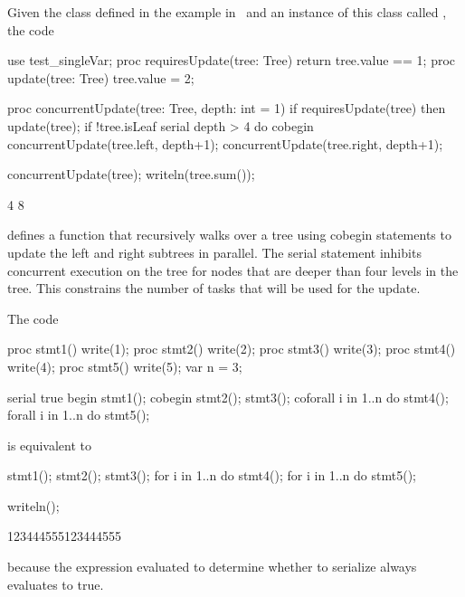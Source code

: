 \begin{example}
Given the  class defined in the example
in~ and an instance of this class
called , the code
\begin{chapelpre}
use test\_singleVar;
proc requiresUpdate(tree: Tree) {
  return tree.value == 1;
}
proc update(tree: Tree) {
  tree.value = 2;
}
\end{chapelpre}
\begin{chapel}
proc concurrentUpdate(tree: Tree, depth: int = 1) {
  if requiresUpdate(tree) then
    update(tree);
  if !tree.isLeaf {
    serial depth > 4 do cobegin {
      concurrentUpdate(tree.left, depth+1);
      concurrentUpdate(tree.right, depth+1);
    }
  }
}
\end{chapel}
\begin{chapelpost}
concurrentUpdate(tree);
writeln(tree.sum());
\end{chapelpost}
\begin{chapeloutput}
4
8
\end{chapeloutput}
defines a function  that recursively walks over
a tree using cobegin statements to update the left and right subtrees
in parallel.  The serial statement inhibits concurrent execution on
the tree for nodes that are deeper than four levels in the tree.  This
constrains the number of tasks that will be used for the update.
\end{example}

\begin{example}
The code
\begin{chapelpre}
proc stmt1() { write(1); }
proc stmt2() { write(2); }
proc stmt3() { write(3); }
proc stmt4() { write(4); }
proc stmt5() { write(5); }
var n = 3;
\end{chapelpre}
\begin{chapel}
serial true {
  begin stmt1();
  cobegin {
    stmt2();
    stmt3();
  }
  coforall i in 1..n do stmt4();
  forall i in 1..n do stmt5();
}
\end{chapel}
is equivalent to
\begin{chapel}
stmt1();
{
  stmt2();
  stmt3();
}
for i in 1..n do stmt4();
for i in 1..n do stmt5();
\end{chapel}
\begin{chapelpost}
writeln();
\end{chapelpost}
\begin{chapeloutput}
123444555123444555
\end{chapeloutput}
because the expression evaluated to determine whether to serialize
always evaluates to true.
\end{example}

